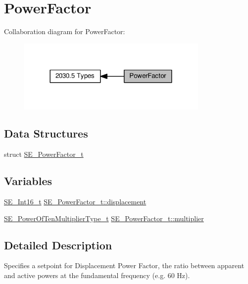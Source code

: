 \hypertarget{group__PowerFactor}{}\section{Power\+Factor}
\label{group__PowerFactor}
Collaboration diagram for Power\+Factor\+:\nopagebreak
\begin{figure}[H]
\begin{center}
\leavevmode
\includegraphics[width=264pt]{group__PowerFactor}
\end{center}
\end{figure}
\subsection*{Data Structures}
\begin{DoxyCompactItemize}
\item 
struct \hyperlink{structSE__PowerFactor__t}{S\+E\+\_\+\+Power\+Factor\+\_\+t}
\end{DoxyCompactItemize}
\subsection*{Variables}
\begin{DoxyCompactItemize}
\item 
\hyperlink{group__Int16_ga0d600c7df811a7d4b4816e8965877690}{S\+E\+\_\+\+Int16\+\_\+t} \hyperlink{group__PowerFactor_gac0b338823886a77ad3c03fab42c9ac5a}{S\+E\+\_\+\+Power\+Factor\+\_\+t\+::displacement}
\item 
\hyperlink{group__PowerOfTenMultiplierType_gaf0317b781dc8dbb9cb6ac4e44a14fdef}{S\+E\+\_\+\+Power\+Of\+Ten\+Multiplier\+Type\+\_\+t} \hyperlink{group__PowerFactor_ga7e8d88767803b7c7ed6f1c6f7eb5e08a}{S\+E\+\_\+\+Power\+Factor\+\_\+t\+::multiplier}
\end{DoxyCompactItemize}


\subsection{Detailed Description}
Specifies a setpoint for Displacement Power Factor, the ratio between apparent and active powers at the fundamental frequency (e.\+g. 60 Hz). 

